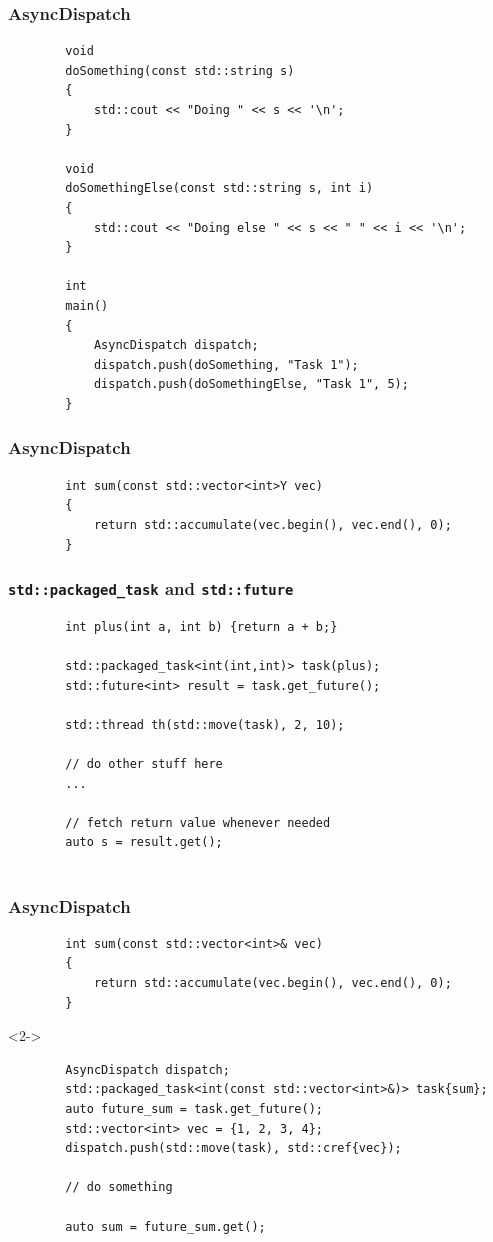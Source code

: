 \documentclass{beamer}
\begin{document}
\begin{frame}[fragile]
\frametitle{AsyncDispatch}
    \begin{lstlisting}
        void
        doSomething(const std::string s)
        {
            std::cout << "Doing " << s << '\n';
        }

        void
        doSomethingElse(const std::string s, int i)
        {
            std::cout << "Doing else " << s << " " << i << '\n';
        }

        int
        main()
        {
            AsyncDispatch dispatch;
            dispatch.push(doSomething, "Task 1");
            dispatch.push(doSomethingElse, "Task 1", 5);
        }
    \end{lstlisting}
\end{frame}

\begin{frame}[fragile]
\frametitle{AsyncDispatch}
    \begin{lstlisting}
        int sum(const std::vector<int>Y vec)
        {
            return std::accumulate(vec.begin(), vec.end(), 0);
        }
    \end{lstlisting}
\end{frame}

\begin{frame}[fragile]
\frametitle{\texttt{std::packaged\_task} and \texttt{std::future}}
    \begin{lstlisting}
        int plus(int a, int b) {return a + b;}

        std::packaged_task<int(int,int)> task(plus);
        std::future<int> result = task.get_future();
     
        std::thread th(std::move(task), 2, 10);

        // do other stuff here
        ...
    
        // fetch return value whenever needed
        auto s = result.get();
        
    \end{lstlisting}

\end{frame}

\begin{frame}[fragile]
\frametitle{AsyncDispatch}
    \begin{lstlisting}
        int sum(const std::vector<int>& vec)
        {
            return std::accumulate(vec.begin(), vec.end(), 0);
        }
    \end{lstlisting}

    \begin{onlyenv}<2->
    \begin{lstlisting}
        AsyncDispatch dispatch;
        std::packaged_task<int(const std::vector<int>&)> task{sum};
        auto future_sum = task.get_future();
        std::vector<int> vec = {1, 2, 3, 4};
        dispatch.push(std::move(task), std::cref{vec});

        // do something

        auto sum = future_sum.get();
    \end{lstlisting}
    \end{onlyenv}
\end{frame}
\end{document}
